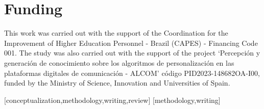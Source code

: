 \documentclass[english]{textolivre}
\begin{document}
\begin{polyabstract}
\begin{portuguese}
\begin{abstract}
\end{abstract}
\end{portuguese}
\end{polyabstract}






\section*{Funding} This work was carried out with the support of the
Coordination for the Improvement of Higher Education Personnel - Brazil (CAPES)
- Financing Code 001. The study was also carried out with the support of the
project `Percepción y generación de conocimiento sobre los algoritmos de
personalización en las plataformas digitales de comunicación - ALCOM' código
PID2023-148682OA-I00, funded by the Ministry of Science, Innovation and
Universities of Spain.



\printbibliography\label{sec-bib}
\begin{contributors}
[conceptualization,methodology,writing,review]
[methodology,writing]
\end{contributors}

\appendix

\end{document}
